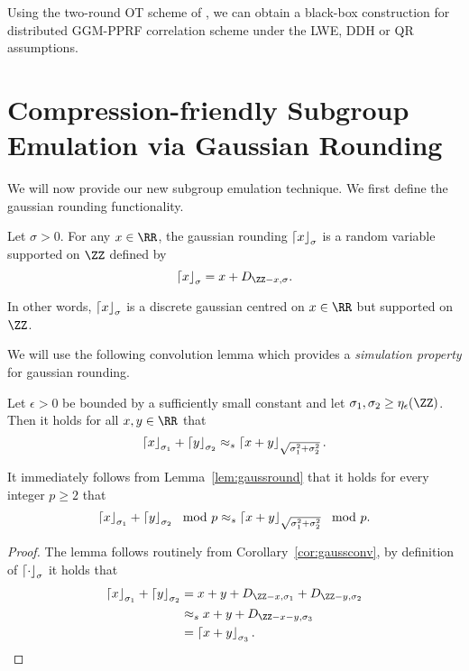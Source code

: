 Using the two-round OT scheme of \cite{C:PeiVaiWat08}, we can obtain a black-box construction for distributed GGM-PPRF correlation scheme under the LWE, DDH or QR assumptions.



\section{Compression-friendly Subgroup Emulation via Gaussian Rounding}
\label{sec:subgroup}

We will now provide our new subgroup emulation technique. We first define the gaussian rounding functionality.

\begin{definition}
Let $\sigma > 0$. For any $x \in \RR$, the gaussian rounding $\left\lceil x \right\rfloor_{\sigma}$ is a random variable supported on $\ZZ$ defined by
\[
\gaussround{x}{\sigma} = x + D_{\ZZ - x,\sigma}.
\]
\end{definition}

In other words, $\left\lceil x \right\rfloor_{\sigma}$ is a discrete gaussian centred on $x \in \RR$ but supported on $\ZZ$.


We will use the following convolution lemma which provides a \emph{simulation property} for gaussian rounding.

\begin{lemma}\label{lem:gaussround}
Let $\epsilon > 0$ be bounded by a sufficiently small constant and let $\sigma_1,\sigma_2 \geq \eta_\epsilon(\ZZ)$. Then it holds for all $x,y \in \RR$ that
\[
\left\lceil x \right\rfloor_{\sigma_1} + \left\lceil y \right\rfloor_{\sigma_2} \approx_s \left\lceil x + y \right\rfloor_{\sqrt{\sigma_1^2 + \sigma_2^2}}.
\]
\end{lemma}
It immediately follows from Lemma~\ref{lem:gaussround} that it holds for every integer $p \geq 2$ that
\[
\left\lceil x \right\rfloor_{\sigma_1} + \left\lceil y \right\rfloor_{\sigma_2} \mod p \approx_s \left\lceil x + y \right\rfloor_{\sqrt{\sigma_1^2 + \sigma_2^2}} \mod p.
\]

\begin{proof}
The lemma follows routinely from Corollary~\ref{cor:gaussconv}, by definition of $\left\lceil \cdot \right\rfloor_{\sigma}$ it holds that
\begin{align*}
    \gaussround{x}{\sigma_1} + \gaussround{y}{\sigma_2} &= x + y + D_{\ZZ - x,\sigma_1} + D_{\ZZ - y,\sigma_2}\\
    &\approx_s x + y + D_{\ZZ - x - y,\sigma_3}\\
    &=\gaussround{x + y}{\sigma_3}.
\end{align*}
\end{proof}


